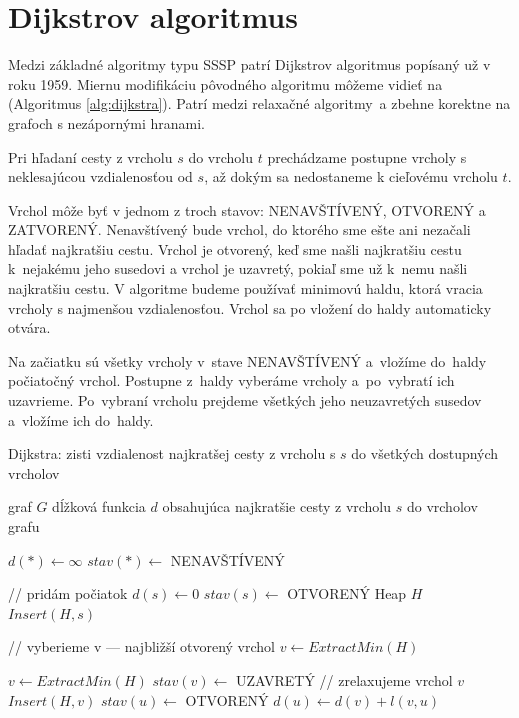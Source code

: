\section{Dijkstrov algoritmus}
Medzi základné algoritmy typu SSSP patrí Dijkstrov algoritmus \cite{dijkstra59} popísaný už v roku 1959. 
Miernu modifikáciu pôvodného algoritmu môžeme vidieť na (Algoritmus \ref{alg:dijkstra}). 
Patrí medzi relaxačné algoritmy~a zbehne korektne na grafoch
s nezápornými hranami.

Pri hľadaní cesty z vrcholu $s$ do vrcholu $t$ prechádzame postupne vrcholy s neklesajúcou vzdialenosťou od $s$, až dokým sa nedostaneme k cieľovému vrcholu $t$.

Vrchol môže byť v jednom z troch stavov: NENAVŠTÍVENÝ, OTVORENÝ a ZATVORENÝ.
Nenavštívený bude vrchol, do ktorého sme ešte ani nezačali hľadať najkratšiu cestu. Vrchol je otvorený, keď sme našli najkratšiu cestu 
k~nejakému jeho susedovi a vrchol je uzavretý, pokiaľ sme už k~nemu našli najkratšiu cestu.
V algoritme budeme používať minimovú haldu, ktorá vracia vrcholy s najmenšou vzdialenosťou.
Vrchol sa po vložení do haldy automaticky otvára.

Na začiatku sú všetky vrcholy v~stave NENAVŠTÍVENÝ a~vložíme do~haldy počiatočný vrchol.
Postupne z~haldy vyberáme vrcholy a~po~vybratí ich uzavrieme. 
Po~vybraní vrcholu prejdeme všetkých jeho neuzavretých susedov a~vložíme ich do~haldy.


\begin{algorithm}
\caption{Dijkstra: zisti vzdialenost najkratšej cesty z vrcholu s $s$ do všetkých dostupných vrcholov}
\label{alg:dijkstra}
\begin{algorithmic}[1] %
\REQUIRE graf $G$
\ENSURE dĺžková funkcia $d$ obsahujúca najkratšie cesty  z vrcholu $s$ do vrcholov grafu


\STATE $ d(*) \leftarrow \infty $
\STATE $ stav(*) \leftarrow$ NENAVŠTÍVENÝ

\STATE // pridám počiatok
\STATE $d(s) \leftarrow 0$
\STATE $stav(s) \leftarrow $ OTVORENÝ
\STATE Heap $H$
\STATE $Insert(H, s)$

	
	\STATE // vyberieme v --- najbližší otvorený vrchol
	\STATE $v \leftarrow ExtractMin(H)$
	
		\STATE $v \leftarrow ExtractMin(H)$
	\ENDWHILE
	\STATE $stav(v) \leftarrow$ UZAVRETÝ
	\STATE // zrelaxujeme vrchol $v$
			\STATE $Insert(H, v)$
			\STATE $stav(u) \leftarrow$ OTVORENÝ
			\STATE $d(u) \leftarrow d(v) + l(v, u)$
			
		\ENDIF
	\ENDFOR
\ENDWHILE

\end{algorithmic}
\end{algorithm}

